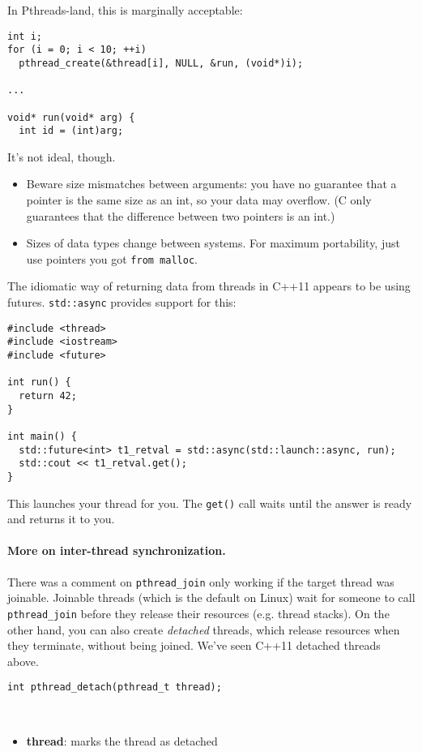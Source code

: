 In Pthreads-land, this is marginally acceptable:
\begin{verbatim}
int i;
for (i = 0; i < 10; ++i)
  pthread_create(&thread[i], NULL, &run, (void*)i);

...

void* run(void* arg) {
  int id = (int)arg;
\end{verbatim}
It's not ideal, though.
  \begin{itemize}
    \item Beware size mismatches between arguments: you have
      no guarantee that a pointer is the same size as an int, so your data
      may overflow. (C only guarantees that the difference between two pointers is an int.)
    \item Sizes of data types change between systems. For maximum
      portability, just use pointers you got {\tt from malloc}.
  \end{itemize}

  The idiomatic way of returning data from threads in C++11 appears to be using
  futures. {\tt std::async} provides support for this:
\begin{verbatim}
#include <thread>
#include <iostream>
#include <future>

int run() {
  return 42;
}

int main() {
  std::future<int> t1_retval = std::async(std::launch::async, run);
  std::cout << t1_retval.get();
}
\end{verbatim}
This launches your thread for you. The {\tt get()} call waits until the answer
is ready and returns it to you.

\paragraph{More on inter-thread synchronization.} There was a comment on {\tt pthread\_join}
only working if the target thread was joinable. Joinable threads
(which is the default on Linux) wait for someone to call {\tt pthread\_join}
before they release their resources (e.g. thread stacks). On the other
hand, you can also create \emph{detached} threads, which release
resources when they terminate, without being joined. We've seen C++11 detached
threads above.

\begin{verbatim}
int pthread_detach(pthread_t thread);
\end{verbatim}
~\vspace*{-3em}
\begin{itemize}
\item  {\bf thread}: marks the thread as detached
\end{itemize}


